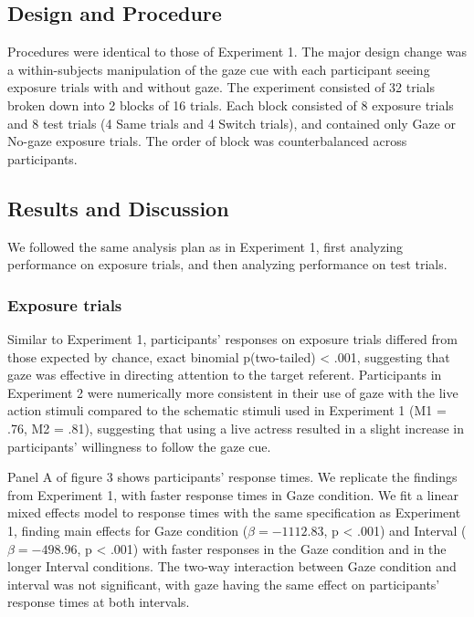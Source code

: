 \documentclass[a4paper,man,natbib]{apa6}
\begin{document}
\subsection{Design and Procedure}\label{design-and-procedure-1}

Procedures were identical to those of Experiment 1. The major design
change was a within-subjects manipulation of the gaze cue with each
participant seeing exposure trials with and without gaze. The experiment
consisted of 32 trials broken down into 2 blocks of 16 trials. Each
block consisted of 8 exposure trials and 8 test trials (4 Same trials
and 4 Switch trials), and contained only Gaze or No-gaze exposure
trials. The order of block was counterbalanced across participants.

\subsection{Results and Discussion}\label{results-and-discussion-1}

We followed the same analysis plan as in Experiment 1, first analyzing
performance on exposure trials, and then analyzing performance on test
trials.

\subsubsection{Exposure trials}\label{exposure-trials-1}

Similar to Experiment 1, participants' responses on exposure trials
differed from those expected by chance, exact binomial p(two-tailed)
\textless{} .001, suggesting that gaze was effective in directing
attention to the target referent. Participants in Experiment 2 were
numerically more consistent in their use of gaze with the live action
stimuli compared to the schematic stimuli used in Experiment 1 (M1 =
.76, M2 = .81), suggesting that using a live actress resulted in a
slight increase in participants' willingness to follow the gaze cue.

Panel A of figure 3 shows participants' response times. We replicate the
findings from Experiment 1, with faster response times in Gaze
condition. We fit a linear mixed effects model to response times with
the same specification as Experiment 1, finding main effects for Gaze
condition (\(\beta = -1112.83\), p \textless{} .001) and Interval
(\(\beta = -498.96\), p \textless{} .001) with faster responses in the
Gaze condition and in the longer Interval conditions. The two-way
interaction between Gaze condition and interval was not significant,
with gaze having the same effect on participants' response times at both
intervals.
\end{document}
